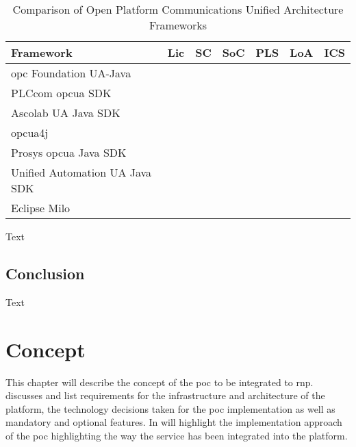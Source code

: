 \documentclass[
a4paper,
twoside,
headsepline,
cleardoublepage=empty,
parskip=half,
draft=false
]{scrbook}
\begin{document}
			\begin{table}[hbtp]
				\centering
				\caption{Comparison of Open Platform Communications Unified Architecture Frameworks}
				\label{tab:framework_comparison}
				\begin{tabular}{l c c c c c c}
					\toprule
					Framework & Lic & SC & SoC & PLS & LoA & ICS
					\\ \midrule
					\gls{opc} Foundation UA-Java & \harveyBallFull & \harveyBallFull & \harveyBallNone & \harveyBallQuarter & \harveyBallQuarter & \harveyBallFull
					\\ \midrule
					PLCcom \gls{opcua} SDK & \harveyBallNone & \harveyBallFull & \harveyBallFull & \harveyBallHalf & \harveyBallFull & \harveyBallFull
					\\ \midrule
					Ascolab UA Java SDK & \harveyBallNone & \harveyBallFull & \harveyBallNone & \harveyBallThreeQuarter & \harveyBallThreeQuarter & \harveyBallHalf
					\\ \midrule
					opcua4j & \harveyBallFull & \harveyBallHalf & \harveyBallNone & \harveyBallQuarter & \harveyBallFull & \harveyBallQuarter
					\\ \midrule
					Prosys \gls{opcua} Java SDK & \harveyBallNone & \harveyBallFull & \harveyBallFull & \harveyBallQuarter & \harveyBallFull & \harveyBallHalf
					\\ \midrule
					Unified Automation UA Java SDK & \harveyBallNone & \harveyBallFull & \harveyBallFull & \harveyBallThreeQuarter & \harveyBallFull & \harveyBallHalf
					\\ \midrule
					Eclipse Milo & \harveyBallFull & \harveyBallFull & \harveyBallFull & \harveyBallQuarter & \harveyBallFull & \harveyBallFull
					\\ \bottomrule
				\end{tabular}
			\end{table}
		
			Text
			
		\section*{Conclusion}\label{sec:evaluation_conclusion}
		
			Text

	\chapter{Concept} \label{ch:concept}

		This chapter will describe the concept of the \gls{poc} to be integrated to \gls{rnp}.
		 discusses and list requirements for the infrastructure and architecture of the platform, the technology decisions taken for the \gls{poc} implementation as well as mandatory and optional features. In  will highlight the implementation approach of the \gls{poc} highlighting the way the service has been integrated into the platform.
\end{document}
